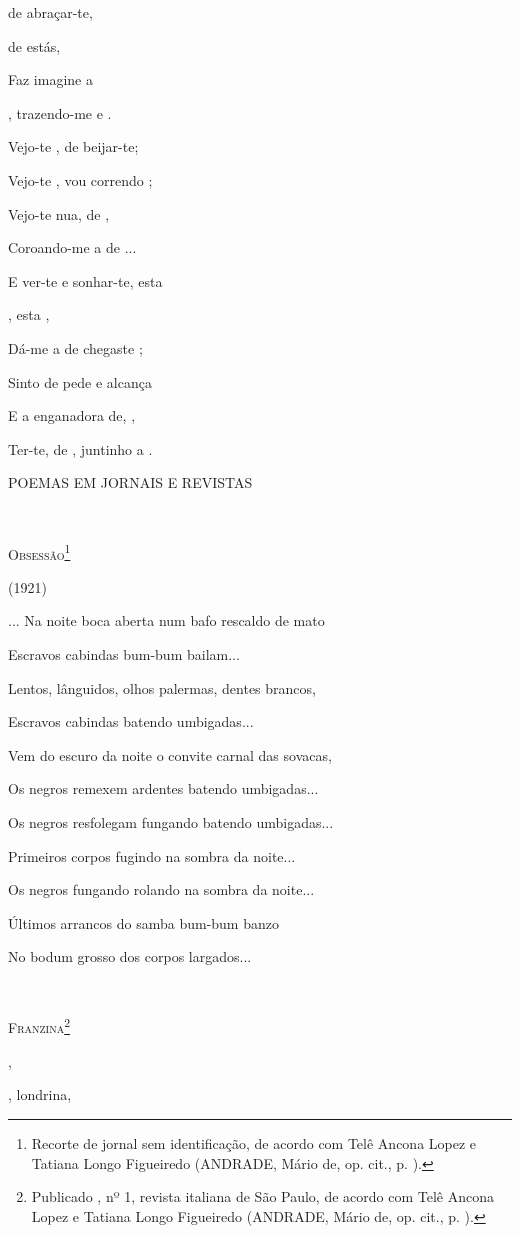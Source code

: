 de abraçar-te,

de estás,

Faz imagine a

, trazendo-me e .

Vejo-te , de beijar-te;

Vejo-te , vou correndo ;

Vejo-te nua, de ,

Coroando-me a de ...

E ver-te e sonhar-te, esta

, esta ,

Dá-me a de chegaste ;

Sinto de pede e alcança

E a enganadora de, ,

Ter-te, de , juntinho a .

\textsc{POEMAS EM JORNAIS E REVISTAS}

\textsc{\\
}

\textsc{Obsessão}\footnote{Recorte de jornal sem identificação, de
  acordo com Telê Ancona Lopez e Tatiana Longo Figueiredo (ANDRADE,
  Mário de, op. cit., p. ).}

(1921)

... Na noite boca aberta num bafo rescaldo de mato

Escravos cabindas bum-bum bailam...

Lentos, lânguidos, olhos palermas, dentes brancos,

Escravos cabindas batendo umbigadas...

Vem do escuro da noite o convite carnal das sovacas,

Os negros remexem ardentes batendo umbigadas...

Os negros resfolegam fungando batendo umbigadas...

Primeiros corpos fugindo na sombra da noite...

Os negros fungando rolando na sombra da noite...

Últimos arrancos do samba bum-bum banzo

No bodum grosso dos corpos largados...

\textsc{\\
}

\textsc{Franzina}\footnote{Publicado , nº 1, revista italiana de São
  Paulo, de acordo com Telê Ancona Lopez e Tatiana Longo Figueiredo
  (ANDRADE, Mário de, op. cit., p. ).}

,

, londrina,

